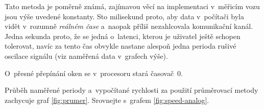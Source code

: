 Tato metoda je poměrně známá, zajímavou věcí na implementaci v~měřicím vozu
jsou výše uvedené konstanty. Sto milisekund proto, aby data v~počítači byla
vidět v~rozumně \textit{reálném čase} a~naopak příliš nezahlcovala komunikační
kanál. Jedna sekunda proto, že se jedná o~latenci, kterou je uživatel ještě
schopen tolerovat, navíc za tento čas obvykle nastane alespoň jedna perioda
rušivé oscilace signálu (viz naměřená data v~grafech výše).

O~přesné přepínání oken se v~procesoru stará časovač~0.

Průběh naměřené periody a~vypočítané rychlosti za použití průměrovací metody
zachycuje graf \ref{fig:prumer}. Srovnejte s~grafem \ref{fig:speed-analog}.
